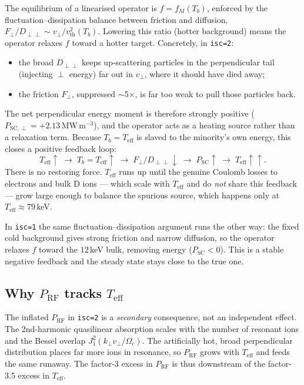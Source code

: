 \documentclass[11pt,a4paper]{article}
\begin{document}
The equilibrium of a linearised operator is $f = f_M(T_b)$, enforced by the
fluctuation--dissipation balance between friction and diffusion,
$F_\perp / D_{\perp\perp} \sim v_\perp / v_\text{th}^2(T_b)$. Lowering this
ratio (hotter background) means the operator relaxes $f$ toward a hotter
target. Concretely, in \texttt{isc=2}:
\begin{itemize}
  \item the broad $D_{\perp\perp}$ keeps up-scattering particles in the
        perpendicular tail (injecting $\perp$ energy) far out in $v_\perp$,
        where it should have died away;
  \item the friction $F_\perp$, suppressed $\sim$5$\times$, is far too weak to
        pull those particles back.
\end{itemize}
The net perpendicular energy moment is therefore strongly positive
($P_{\mathrm{SC},\perp} = +2.13$\,MW\,m$^{-3}$), and the operator acts as a
heating source rather than a relaxation term. Because $T_b = T_\text{eff}$ is
slaved to the minority's own energy, this closes a positive feedback loop:
\begin{equation*}
  T_\text{eff}\uparrow
  \;\longrightarrow\; T_b = T_\text{eff}\uparrow
  \;\longrightarrow\; F_\perp/D_{\perp\perp}\downarrow
  \;\longrightarrow\; P_\text{SC}\uparrow
  \;\longrightarrow\; T_\text{eff}\uparrow\uparrow.
\end{equation*}
There is no restoring force. $T_\text{eff}$ runs up until the genuine Coulomb
losses to electrons and bulk D ions --- which scale with $T_\text{eff}$ and do
\emph{not} share this feedback --- grow large enough to balance the spurious
source, which happens only at $T_\text{eff} \approx 79$\,keV.

In \texttt{isc=1} the same fluctuation--dissipation argument runs the other
way: the fixed cold background gives strong friction and narrow diffusion, so
the operator relaxes $f$ toward the $12$\,keV bulk, removing energy
($P_\text{SC} < 0$). This is a stable negative feedback and the steady state
stays close to the true one.

\subsection{Why \texorpdfstring{$P_\text{RF}$}{P\_RF} tracks \texorpdfstring{$T_\text{eff}$}{Teff}}

The inflated $P_\text{RF}$ in \texttt{isc=2} is a \emph{secondary}
consequence, not an independent effect. The 2nd-harmonic quasilinear
absorption scales with the number of resonant ions and the Bessel overlap
$J_1^2(k_\perp v_\perp/\Omega_c)$. The artificially hot, broad perpendicular
distribution places far more ions in resonance, so $P_\text{RF}$ grows with
$T_\text{eff}$ and feeds the same runaway. The factor-3 excess in
$P_\text{RF}$ is thus downstream of the factor-3.5 excess in $T_\text{eff}$.
\end{document}
